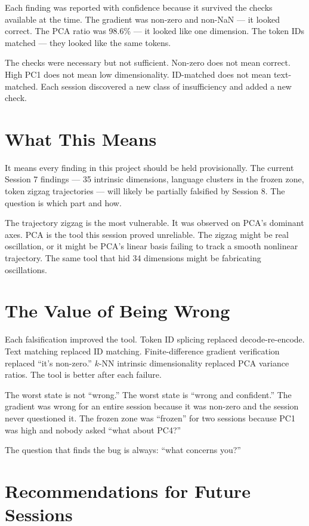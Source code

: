 \documentclass[11pt]{article}
\begin{document}
Each finding was reported with confidence because it survived the checks available at the time. The gradient was non-zero and non-NaN --- it looked correct. The PCA ratio was 98.6\% --- it looked like one dimension. The token IDs matched --- they looked like the same tokens.

The checks were necessary but not sufficient. Non-zero does not mean correct. High PC1 does not mean low dimensionality. ID-matched does not mean text-matched. Each session discovered a new class of insufficiency and added a new check.

\section{What This Means}

It means every finding in this project should be held provisionally. The current Session 7 findings --- 35 intrinsic dimensions, language clusters in the frozen zone, token zigzag trajectories --- will likely be partially falsified by Session 8. The question is which part and how.

The trajectory zigzag is the most vulnerable. It was observed on PCA's dominant axes. PCA is the tool this session proved unreliable. The zigzag might be real oscillation, or it might be PCA's linear basis failing to track a smooth nonlinear trajectory. The same tool that hid 34 dimensions might be fabricating oscillations.

\section{The Value of Being Wrong}

Each falsification improved the tool. Token ID splicing replaced decode-re-encode. Text matching replaced ID matching. Finite-difference gradient verification replaced ``it's non-zero.'' $k$-NN intrinsic dimensionality replaced PCA variance ratios. The tool is better after each failure.

The worst state is not ``wrong.'' The worst state is ``wrong and confident.'' The gradient was wrong for an entire session because it was non-zero and the session never questioned it. The frozen zone was ``frozen'' for two sessions because PC1 was high and nobody asked ``what about PC4?''

The question that finds the bug is always: ``what concerns you?''

\section{Recommendations for Future Sessions}
\end{document}
